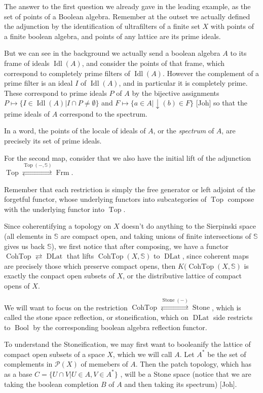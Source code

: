 \documentclass[12pt,a4paper]{article}
\DeclareMathOperator{\Frm}{Frm}
\DeclareMathOperator{\Top}{Top}
\DeclareMathOperator{\Bool}{Bool}
\DeclareMathOperator{\DLat}{DLat}
\DeclareMathOperator{\CohTop}{CohTop}
\DeclareMathOperator{\Stone}{Stone}
\DeclareMathOperator{\Idl}{Idl}
\begin{document}
The answer to the first question we already gave in the leading example, as the set of points of a Boolean algebra. Remember at the outset we actually defined the adjunction by the identification of ultrafilters of a finite set $X$ with points of a finite boolean algebra, and points of any lattice are its prime ideals.

But we can see in the background we actually send a boolean algebra $A$ to its frame of ideals $\Idl(A)$, and consider the points of that frame, which correspond to completely prime filters of $\Idl(A)$. However the complement of a prime filter is an ideal $I$ of $\Idl(A)$, and in particular it is completely prime. These correspond to prime ideals $P$ of $A$ by the bijective assignments $P \mapsto \{I \in \Idl(A) \lvert I \cap P \neq \emptyset\}$ and $F \mapsto \{a \in A \lvert \downarrow (b) \in F \}$ [Joh] so that the prime ideals of $A$ correspond to the spectrum.

In a word, the points of the locale of ideals of $A$, or the \emph{spectrum} of $A$, are precisely its set of prime ideals.  

For the second map, consider that we also have the initial lift of the adjunction $\Top \stackrel{\Top(-,\mathbb{S})}{\rightleftarrows} \Frm$.

Remember that each restriction is simply the free generator or left adjoint of the forgetful functor, whose underlying functors into subcategories of $\Top$ compose with the underlying functor into $\Top$.

 Since coherentifying a topology on $X$ doesn't do anything to the Sierpinski space (all elements in $\mathbb{S}$ are compact open, and taking unions of finite intersections of $\mathbb{S}$ gives us back $\mathbb{S}$), we first notice that after composing, we have a functor $\CohTop \rightleftarrows \DLat$ that lifts $\CohTop(X, \mathbb{S})$ to $\DLat$, since coherent maps are precisely those which preserve compact opens, then $K(\CohTop(X, \mathbb{S})$ is exactly the conpact open subsets of $X$, or the distributive lattice of compact opens of $X$. 
 
 We will want to focus on the restriction $\CohTop \stackrel{\Stone(-)}{\rightleftarrows} \Stone$, which is called the stone space reflection, or stoneification, which on $\DLat$ side restricts to $\Bool$ by the corresponding boolean algebra reflection functor.
 
 To understand the Stoneification, we may first want to booleanify the lattice of compact open subsets of a space $X$, which we will call $A$. Let $A^*$ be the set of complements in $\mathcal{P}(X)$ of memebers of $A$. Then the patch topology, which has as a base $C = \{U \cap V \lvert U \in A, V \in A^*\}$ , will be a Stone space (notice that we are taking the boolean completion $B$ of $A$ and then taking its spectrum) [Joh].
 
\end{document}
